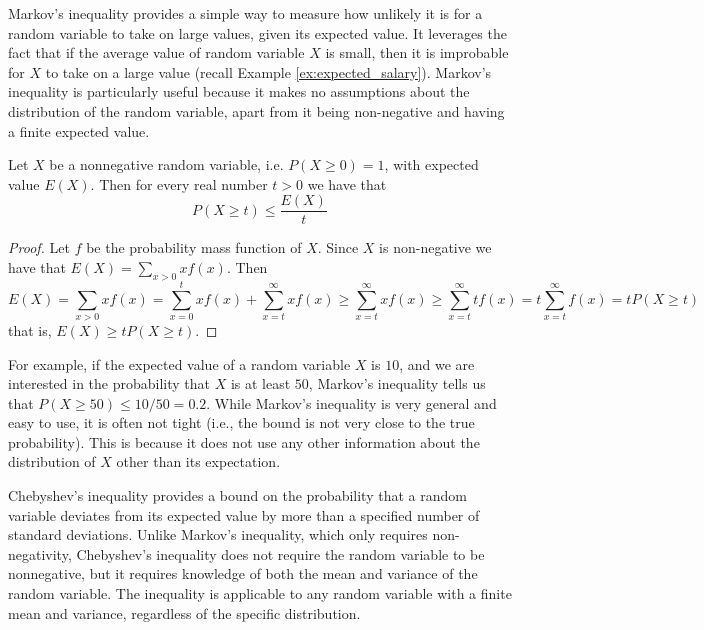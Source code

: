 Markov's inequality provides a simple way to measure how unlikely it is for a random variable to take on large values, given its expected value. It leverages the fact that if the average value of random variable $X$ is small, then it is improbable for $X$ to take on a large value (recall Example \ref{ex:expected_salary}). Markov's inequality is particularly useful because it makes no assumptions about the distribution of the random variable, apart from it being non-negative and having a finite expected value.

\begin{proposition}
Let $X$ be a nonnegative random variable, i.e. $P\left( X \geq 0 \right) = 1$, with expected value $E(X)$. Then for every real number $t>0$ we have that 
\[
P \left( X \geq t \right) \leq \frac{E(X)}{t}
\]
\end{proposition}
\begin{proof}
Let $f$ be the probability mass function of $X$. Since $X$ is non-negative we have that $E(X) = \sum_{x>0} x f \left( x \right)$. Then
\[
E(X) = \sum_{x>0} x f \left( x \right) = \sum_{x=0}^{t} x f \left( x \right) + \sum_{x=t}^{\infty} x f \left( x \right) \geq
\sum_{x=t}^{\infty} x f \left( x \right) \geq \sum_{x=t}^{\infty} t f \left( x \right) = t \sum_{x=t}^{\infty} f \left( x \right) =
t P \left( X \geq t \right)
\]
that is, $E(X) \geq t P \left( X \geq t \right)$.
\end{proof}

For example, if the expected value of a random variable $X$ is $10$, and we are interested in the probability that $X$ is at least $50$, Markov's inequality tells us that $P(X \geq 50) \leq 10/50 = 0.2$. While Markov's inequality is very general and easy to use, it is often not tight (i.e., the bound is not very close to the true probability). This is because it does not use any other information about the distribution of $X$ other than its expectation.

Chebyshev's inequality provides a bound on the probability that a random variable deviates from its expected value by more than a specified number of standard deviations. Unlike Markov's inequality, which only requires non-negativity, Chebyshev's inequality does not require the random variable to be nonnegative, but it requires knowledge of both the mean and variance of the random variable. The inequality is applicable to any random variable with a finite mean and variance, regardless of the specific distribution.

